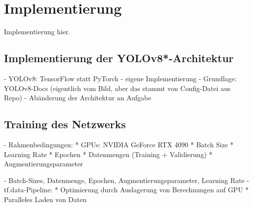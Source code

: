 
\section{Implementierung}
\label{sec:ki:implementierung}

Implementierung hier.


\subsection{Implementierung der YOLOv8*-Architektur}
\label{sec:yolov8_implementierung}

- YOLOv8: TensorFlow statt PyTorch
- eigene Implementierung
- Grundlage: YOLOv8-Docs (eigentlich vom Bild, aber das stammt von Config-Datei aus Repo)
- Abänderung der Architektur an Aufgabe


\subsection{Training des Netzwerks}
\label{sec:training}

- Rahmenbedingungen:
* GPUs: NVIDIA GeForce RTX 4090
* Batch Size
* Learning Rate
* Epochen
* Datenmengen (Training + Validierung)
* Augmentierungsparameter

- Batch-Sizes, Datenmenge, Epochen, Augmentierungsparameter, Learning Rate
- tf.data-Pipeline:
* Optimierung durch Auslagerung von Berechnungen auf GPU
* Paralleles Laden von Daten
